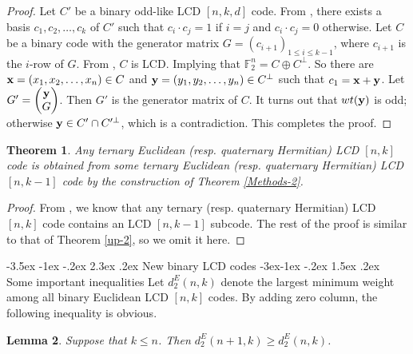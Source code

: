 \documentclass[12pt,twoside]{article}
\makeatletter
\renewcommand\section{\@startsection {section}{1}{\z@}%
                                   {-3.5ex \@plus -1ex \@minus -.2ex}%
                                   {2.3ex \@plus.2ex}%
                                   {\normalfont\large\bfseries}}
\renewcommand\subsection{\@startsection{subsection}{2}{\z@}%
                                     {-3ex\@plus -1ex \@minus -.2ex}%
                                     {1.5ex \@plus .2ex}%
                                     {\normalfont\normalsize\bfseries}}
\newcommand{\F}{\mathbb{F}}
\theoremstyle{plain}
\newtheorem{theorem}{Theorem}[section]
\newtheorem{lem}[theorem]{Lemma}
\theoremstyle{definition}
\theoremstyle{remark}
\makeatother
\begin{document}
\begin{proof}
Let $C'$ be a binary odd-like LCD $[n,k,d]$ code. From \cite[Theorem 3]{LCD-new}, there exists a basis $c_1,c_2,\ldots,c_{k}$ of $C'$ such that $c_i \cdot c_j=1$ if $i=j$ and $c_i\cdot c_j=0$ otherwise. Let $C$ be a binary code with the generator matrix $G=(c_{i+1})_{1\leq i\leq k-1}$, where $c_{i+1}$ is the $i$-row of $G$. From \cite[Theorem 3]{LCD-new}, $C$ is LCD. Implying that $\F_{2}^n=C \oplus C^\perp$.
So there are ${\bf x}=(x_1,x_2,\ldots,x_n)\in C$ and ${\bf y}=(y_1,y_2,\ldots,y_n)\in C^\perp$ such that $c_1={\bf x}+{\bf y}$.
Let $G'=\begin{pmatrix}
{\bf y} \\
 G
\end{pmatrix}$.
Then $G'$ is the generator matrix of $C$.
It turns out that $wt({\bf y})$ is odd; otherwise ${\bf y}\in C'\cap C'^{\perp}$, which is a contradiction.
This completes the proof.
\end{proof}

\begin{theorem}
Any ternary Euclidean (resp. quaternary Hermitian) LCD $[n,k]$ code is obtained from some ternary Euclidean (resp. quaternary Hermitian) LCD $[n,k-1]$ code by the construction of Theorem \ref{Methods-2}.
\end{theorem}

\begin{proof}
From \cite[Propsition 4]{34-LCD}, we know that any ternary (resp. quaternary Hermitian) LCD $[n,k]$ code contains an LCD $[n,k-1]$ subcode.
The rest of the proof is similar to that of Theorem \ref{up-2}, so we omit it here.
\end{proof}






\section{New binary LCD codes}
\subsection{Some important inequalities}
Let $d^E_2 (n, k)$ denote the largest minimum weight among all binary Euclidean LCD $[n, k]$ codes.
By adding zero column, the following inequality is obvious.

\begin{lem}\label{lem-inequality-1}
 Suppose that $ k\leq n$. Then $d^E_2 (n+1, k)\geq d^E_2 (n, k)$.
\end{lem}
\end{document}
